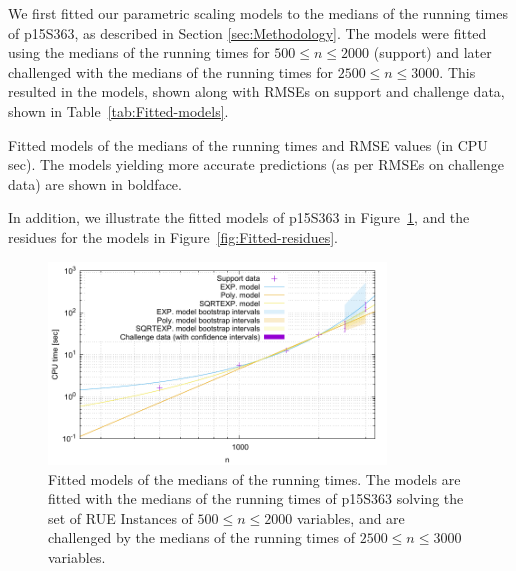 We first fitted our parametric scaling models to the medians of the running times
of p15S363, as described in Section \ref{sec:Methodology}. The
models were fitted using the medians of the running times for $500\leq n\leq 2000$
(support) and later challenged with the medians of the running times for $2500\leq n\leq 3000$.
This resulted in the models, shown along with RMSEs on support and
challenge data, shown in Table~\ref{tab:Fitted-models}.
\begin{table}[tb]
\begin{centering}

% 
\par\end{centering}

\caption{\label{tab:Fitted-models}Fitted models of the medians of the running times and RMSE
values (in CPU sec). The models yielding more
accurate predictions (as per RMSEs on challenge data) are shown in
boldface.}
\end{table}
In addition, we illustrate the fitted models of p15S363 in Figure~\ref{fig:Fitted-models},
and the residues for the models in Figure~\ref{fig:Fitted-residues}.
\begin{figure}[tb]
\noindent \begin{centering}
\includegraphics[width=0.8\textwidth]{fittedModels}
\par\end{centering}

\caption{\label{fig:Fitted-models} Fitted models of the medians of the running times.
The models are fitted with the medians of the running times of
p15S363 solving the set of RUE Instances
of $500\leq n\leq 2000$ variables, and are challenged by the medians of the
running times of $2500\leq n\leq 3000$ variables.}
\end{figure}



